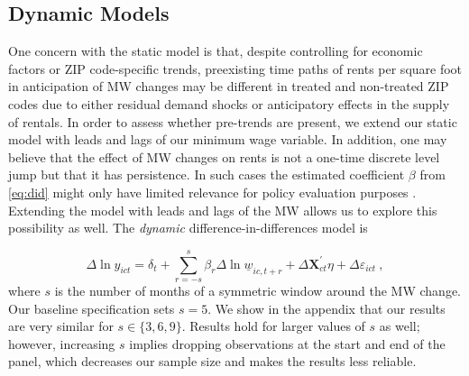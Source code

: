 \subsection{Dynamic Models}

One concern with the static model is that, despite controlling for economic factors or ZIP 
code-specific trends, preexisting time paths of rents per square foot in anticipation of MW 
changes may be different in treated and non-treated ZIP codes due to either residual demand 
shocks or anticipatory effects in the supply of rentals. In order to assess whether pre-trends 
are present, we extend our static model with leads and lags of our minimum wage variable. 
In addition, one may believe that the effect of MW changes on rents is not a one-time discrete 
level jump but that it has persistence. In such cases the estimated coefficient $\beta$ from 
\autoref{eq:did} might only have limited relevance for policy evaluation purposes 
\parencite{callaway2019}. Extending the model with leads and lags of the MW allows us to 
explore this possibility as well. The \textit{dynamic} difference-in-differences model is

\begin{equation} \label{eq:leads_lags}
	\Delta \ln y_{ict} = \delta_t
						+ \sum_{r=-s}^{s} \beta_r \Delta \ln \underline{w}_{ic,t+r}
						+ \Delta \mathbf{X}^{'}_{ct}\eta
						+ \Delta \varepsilon_{ict} \ ,
\end{equation}
where $s$ is the number of months of a symmetric window around the MW change. Our baseline
specification sets $s = 5$. We show in the appendix that our results are very similar for
$s \in \{3, 6, 9\}$. Results hold for larger values of $s$ as well; however, increasing 
$s$ implies dropping observations at the start and end of the panel, which decreases our 
sample size and makes the results less reliable.


